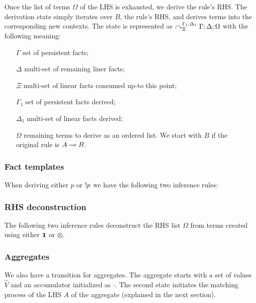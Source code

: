 Once the list of terms $\Omega$ of the LHS is exhausted, we derive the rule's
RHS. The derivation state simply iterates over $B$, the rule's RHS, and derives
terms into the corresponding new contexts. The state is represented as
$\curvearrowright_{\Xi}^{\Gamma_1; \Delta_1} \Gamma; \Delta; \Omega$ with the following
meaning:

\begin{enumerate}
   \item[$\Gamma$] set of persistent facts;

   \item[$\Delta$] multi-set of remaining liner facts;

   \item[$\Xi$] multi-set of linear facts consumed up-to this point;

   \item[$\Gamma_1$] set of persistent facts derived;

   \item[$\Delta_1$] multi-set of linear facts derived;

   \item[$\Omega$] remaining terms to derive as an ordered list. We start with
   $B$ if the original rule is $A \multimap B$.

\end{enumerate}

\subsubsection{Fact templates}

When deriving either $p$ or ${!} p$ we have the following two inference rules:



\subsubsection{RHS deconstruction}

The following two inference rules deconstruct the RHS list $\Omega$ from terms
created using either $\mathbf{1}$ or $\otimes$.



\subsubsection{Aggregates}

We also have a transition for aggregates. The aggregate starts with a set of
values $\widehat{V}$ and an accumulator initialized as $\cdot$. The second state
initiates the matching process of the LHS $A$ of the aggregate (explained in
the next section).

